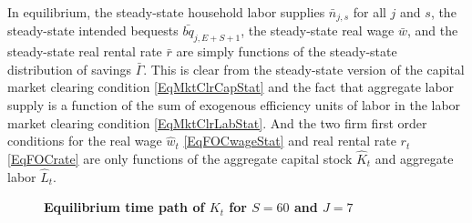 \documentclass[letterpaper,12pt]{article}
\theoremstyle{definition}
\begin{document}
\begin{spacing}{1.5}
    In equilibrium, the steady-state household labor supplies $\bar{n}_{j,s}$ for all $j$ and $s$, the steady-state intended bequests $\bar{bq}_{j,E+S+1}$, the steady-state real wage $\bar{w}$, and the steady-state real rental rate $\bar{r}$ are simply functions of the steady-state distribution of savings $\bar{\Gamma}$. This is clear from the steady-state version of the capital market clearing condition \eqref{EqMktClrCapStat} and the fact that aggregate labor supply is a function of the sum of exogenous efficiency units of labor in the labor market clearing condition \eqref{EqMktClrLabStat}. And the two firm first order conditions for the real wage $\hat{w}_t$ \eqref{EqFOCwageStat} and real rental rate $r_t$ \eqref{EqFOCrate} are only functions of the aggregate capital stock $\hat{K}_t$ and aggregate labor $\hat{L}_t$.

    \begin{figure}[htb]\centering \captionsetup{width=4.0in}
      \caption{\label{FigKpathTPI}\textbf{Equilibrium time path of $K_t$ for $S=60$ and $J=7$}}
    \end{figure}


\end{spacing}
\end{document}
